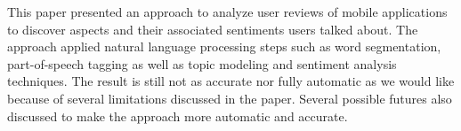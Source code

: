 This paper presented an approach to analyze user reviews of mobile applications to discover aspects and their associated sentiments users talked about. The approach applied natural language processing steps such as word segmentation, part-of-speech tagging as well as topic modeling and sentiment analysis techniques. The result is still not as accurate nor fully automatic as we would like because of several limitations discussed in the paper. Several possible futures also discussed to make the approach more automatic and accurate.
